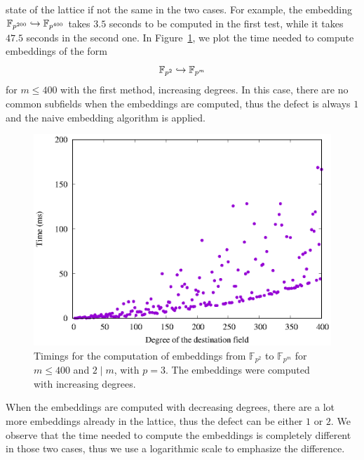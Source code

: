 state of the lattice if not the same in the two cases. For example, the
embedding $\mathbb{F}_{p^{200}}\hookrightarrow\mathbb{F}_{p^{400}}$ takes $3.5$ seconds to
be computed in the first test, while it takes $47.5$ seconds in the second one.
In Figure~\ref{fig:bcs-embed-from-2-up}, we plot the time needed to compute
embeddings of the form
\[
  \mathbb{F}_{p^{2}}\hookrightarrow \mathbb{F}_{p^{m}}
\]
for $m\leq 400$ with the first method, \ie increasing degrees. In this case,
there are no common subfields when the embeddings are computed, thus the defect
is always $1$ and the naive embedding algorithm is applied.
\begin{figure}
  \centering
  \includegraphics{benchmarks/lattice-bcs/embed-from-2-up-3.eps}
  \caption{Timings for the computation of embeddings from $\mathbb{F}_{p^{2}}$
  to $\mathbb{F}_{p^{m}}$ for $m\leq 400$ and $2\mid m$, with $p=3$. The
  embeddings were computed with increasing degrees.}
  \label{fig:bcs-embed-from-2-up}
\end{figure}
When the embeddings are computed with decreasing degrees, there are a lot more
embeddings already in the lattice, thus the defect can be either $1$ or $2$. We
observe that the time needed to compute the embeddings is completely different
in those two cases, thus we use a logarithmic scale to emphasize the difference.
